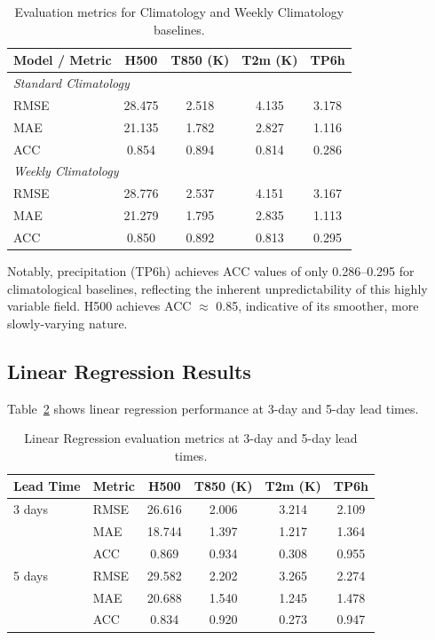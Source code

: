 \documentclass[12pt,a4paper,oneside]{report}
\begin{document}
\begin{table}[H]
\centering
\caption{Evaluation metrics for Climatology and Weekly Climatology baselines.}
\label{tab:clim}
\begin{tabular}{lcccc}
\toprule
\textbf{Model / Metric} & \textbf{H500} & \textbf{T850 (K)} & \textbf{T2m (K)} & \textbf{TP6h} \\
\midrule
\multicolumn{5}{l}{\textit{Standard Climatology}} \\
RMSE & 28.475 & 2.518 & 4.135 & 3.178 \\
MAE  & 21.135 & 1.782 & 2.827 & 1.116 \\
ACC  & 0.854  & 0.894 & 0.814 & 0.286 \\
\midrule
\multicolumn{5}{l}{\textit{Weekly Climatology}} \\
RMSE & 28.776 & 2.537 & 4.151 & 3.167 \\
MAE  & 21.279 & 1.795 & 2.835 & 1.113 \\
ACC  & 0.850  & 0.892 & 0.813 & 0.295 \\
\bottomrule
\end{tabular}
\end{table}

Notably, precipitation (TP6h) achieves ACC values of only 0.286--0.295 for climatological baselines, reflecting the inherent unpredictability of this highly variable field. H500 achieves ACC $\approx$ 0.85, indicative of its smoother, more slowly-varying nature.

\subsection{Linear Regression Results}

Table~\ref{tab:linreg} shows linear regression performance at 3-day and 5-day lead times.

\begin{table}[H]
\centering
\caption{Linear Regression evaluation metrics at 3-day and 5-day lead times.}
\label{tab:linreg}
\begin{tabular}{llcccc}
\toprule
\textbf{Lead Time} & \textbf{Metric} & \textbf{H500} & \textbf{T850 (K)} & \textbf{T2m (K)} & \textbf{TP6h} \\
\midrule
3 days & RMSE & 26.616 & 2.006 & 3.214 & 2.109 \\
       & MAE  & 18.744 & 1.397 & 1.217 & 1.364 \\
       & ACC  & 0.869  & 0.934 & 0.308 & 0.955 \\
\midrule
5 days & RMSE & 29.582 & 2.202 & 3.265 & 2.274 \\
       & MAE  & 20.688 & 1.540 & 1.245 & 1.478 \\
       & ACC  & 0.834  & 0.920 & 0.273 & 0.947 \\
\bottomrule
\end{tabular}
\end{table}
\end{document}
